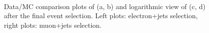 \begin{figure}[hbtp]
\begin{center}
  	 \\
    \caption{Data/MC comparison plots of \MET (a, b) and logarithmic view of \MET (c, d) after the final event
    selection. Left plots: electron+jets selection, right plots: muon+jets selection.}
    \label{fig:contol_plots_METs}
  \end{center}
\end{figure}

